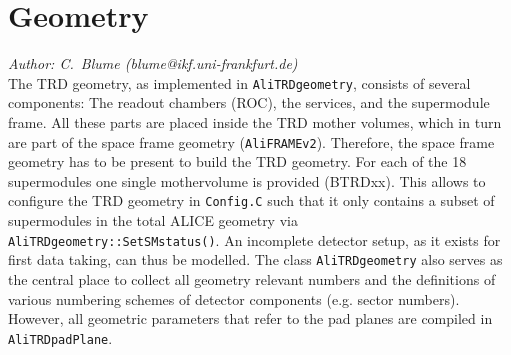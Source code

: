 \documentclass{alicetdr}
\begin{document}
\section{Geometry}
\label{GEO:intro}
%
{\it Author: C.~Blume (blume@ikf.uni-frankfurt.de)}
\smallskip
\\
%
The TRD geometry, as implemented in {\tt AliTRDgeometry}, consists of 
several components: The readout chambers (ROC), the services, and the 
supermodule frame.  All these parts are placed inside the TRD mother 
volumes, which in turn are part of the space frame geometry 
({\tt AliFRAMEv2}).  Therefore, the space frame geometry has to be 
present to build the TRD geometry.  For each of the 18 supermodules 
one single mothervolume is provided (BTRDxx).  This allows to configure 
the TRD geometry in {\tt Config.C} such that it only contains a subset 
of supermodules in the total ALICE geometry via 
{\tt AliTRDgeometry::SetSMstatus()}.  An incomplete detector setup, as
it exists for first data taking, can thus be modelled.  The class
{\tt AliTRDgeometry} also serves as the central place to collect all
geometry relevant numbers and the definitions of various numbering
schemes of detector components (e.g. sector numbers).  However, all 
geometric parameters that refer to the pad planes are compiled in
{\tt AliTRDpadPlane}.
%
\end{document}
